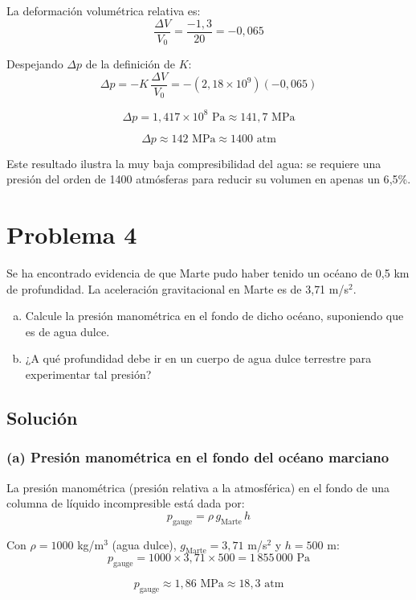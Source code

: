 \documentclass[a4paper]{article}
\begin{document}
La deformación volumétrica relativa es:
$$
\frac{\Delta V}{V_0} = \frac{-1{,}3}{20} = -0{,}065
$$

Despejando $\Delta p$ de la definición de $K$:
$$
\Delta p = -K\,\frac{\Delta V}{V_0} = -\left(2{,}18 \times 10^9\right)(-0{,}065)
$$

$$
\Delta p = 1{,}417 \times 10^8 \text{ Pa} \approx 141{,}7 \text{ MPa}
$$

$$
\boxed{\Delta p \approx 142 \text{ MPa} \approx 1400 \text{ atm}}
$$

Este resultado ilustra la muy baja compresibilidad del agua: se requiere una presión del orden de 1400 atmósferas para reducir su volumen en apenas un 6{,}5\%.

\section{Problema 4}
Se ha encontrado evidencia de que Marte pudo haber tenido un océano de 0{,}5 km de profundidad. La aceleración gravitacional en Marte es de 3{,}71 m/s$^2$.
\begin{enumerate}[a)]
    \item Calcule la presión manométrica en el fondo de dicho océano, suponiendo que es de agua dulce.
    \item ¿A qué profundidad debe ir en un cuerpo de agua dulce terrestre para experimentar tal presión?
\end{enumerate}

\subsection{Solución}

\subsubsection{(a) Presión manométrica en el fondo del océano marciano}

La presión manométrica (presión relativa a la atmosférica) en el fondo de una columna de líquido incompresible está dada por:
$$
p_{\text{gauge}} = \rho\, g_{\text{Marte}}\, h
$$

Con $\rho = 1000$ kg/m$^3$ (agua dulce), $g_{\text{Marte}} = 3{,}71$ m/s$^2$ y $h = 500$ m:
$$
p_{\text{gauge}} = 1000 \times 3{,}71 \times 500 = 1\,855\,000 \text{ Pa}
$$

$$
\boxed{p_{\text{gauge}} \approx 1{,}86 \text{ MPa} \approx 18{,}3 \text{ atm}}
$$
\end{document}

